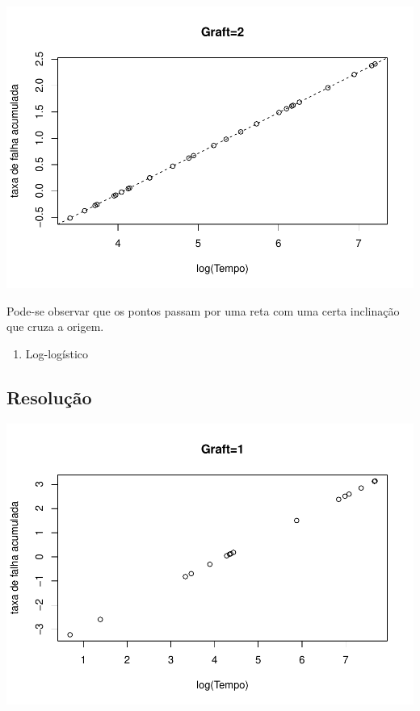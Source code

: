 \documentclass[]{article}
\providecommand{\tightlist}{%
  \setlength{\itemsep}{0pt}\setlength{\parskip}{0pt}}
\begin{document}
\begin{center}\includegraphics[width=0.8\linewidth]{Lista_3_files/figure-latex/unnamed-chunk-13-2} \end{center}

Pode-se observar que os pontos passam por uma reta com uma certa
inclinação que cruza a origem.

\begin{enumerate}
\def\labelenumi{(\alph{enumi})}
\setcounter{enumi}{1}
\tightlist
\item
  Log-logístico
\end{enumerate}

\subsection{Resolução}\label{resolucao-15}

\begin{center}\includegraphics[width=0.8\linewidth]{Lista_3_files/figure-latex/unnamed-chunk-14-1} \end{center}
\end{document}
